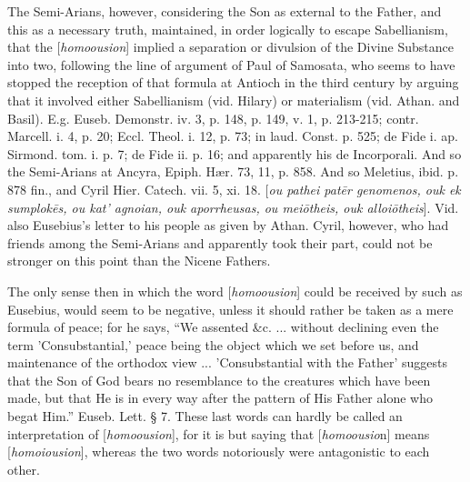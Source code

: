 The Semi-Arians, however, considering the Son as
external to the Father, and this as a necessary truth, maintained, in
order logically to escape Sabellianism, that the [\emph{homoousion}]
implied a separation or divulsion of the Divine Substance into two,
following the line of argument of Paul of Samosata, who seems to have
stopped the reception of that formula at Antioch in the third century
by arguing that it involved either Sabellianism (vid. Hilary) or
materialism (vid. Athan. and Basil). E.g. Euseb. Demonstr. iv. 3, p.
148, p. 149, v. 1, p. 213-215; contr. Marcell. i. 4, p. 20; Eccl.
Theol. i. 12, p. 73; in laud. Const. p. 525; de Fide i. ap. Sirmond.
tom. i. p. 7; de Fide ii. p. 16; and apparently his de Incorporali.
And so the Semi-Arians at Ancyra, Epiph. Hær. 73, 11, p. 858. And so
Meletius, ibid. p. 878 fin., and Cyril Hier. Catech. vii. 5, xi. 18. [\emph{ou
pathei pat\={e}r genomenos, ouk ek sumplok\={e}s, ou kat'
agnoian, ouk aporrheusas, ou mei\={o}theis, ouk alloi\={o}theis}].
Vid. also Eusebius's letter to his people as given by Athan. Cyril,
however, who had friends among the Semi-Arians and apparently took
their part, could not be stronger on this point than the Nicene
Fathers.

The only sense then in which the word [\emph{homoousion}]
could be received by such as Eusebius, would seem to be negative,
unless it should rather be taken as a mere formula of peace; for he
says, ``We assented \&c. ... without declining even the term
'Consubstantial,' peace being the object which we set before us, and
maintenance of the orthodox view ... 'Consubstantial with the Father'
suggests that the Son of God bears no resemblance to the creatures
which have been made, but that He is in every way after the pattern of
His Father alone who begat Him.'' Euseb. Lett. § 7. These last words
can hardly be called an interpretation of [\emph{homoousion}],
for it is but saying that [\emph{homoousio}n] means [\emph{homoiousion}],
whereas the two words notoriously were antagonistic to each other.

